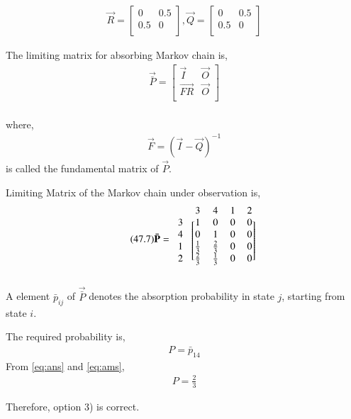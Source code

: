\documentclass[journal,12pt,twocolumn]{IEEEtran}
\begin{document}
\begin{align}
\tag{47.4}
\label{eq:r,q}
    \vec{R}=\begin{bmatrix}
    0 & 0.5\\
    0.5 & 0\\
    \end{bmatrix},
    \vec{Q}=\begin{bmatrix}
    0 & 0.5 \\
    0.5 & 0 \\
    \end{bmatrix}
\end{align}
\begin{definition}
The limiting matrix for absorbing Markov chain is,
\begin{align}
\tag{47.5}
\label{eq:pbar}
    \vec{\bar P}=\begin{bmatrix}
    \vec{I} & \vec{O}\\
    \vec{FR} & \vec{O}\\
    \end{bmatrix}
\end{align}
\\where,
\begin{align}
\tag{47.6}
\label{eq:f}
    \vec{F}=(\vec{I}-\vec{Q})^{-1}
\end{align}
is called the fundamental matrix of $\vec{P}$. \\
\end{definition}
\begin{corollary}
Limiting Matrix of the Markov chain under observation is, 
\begin{align} 
\tag{47.7}
\label{eq:ans}
    \vec{\bar P}=\begin{blockarray}{ccccc}
&3 &4 &1 &2\\
\begin{block}{c[cccc]}
    3 & 1 & 0 & 0 & 0  \\
    4 & 0 & 1 & 0 & 0  \\
    1 & \frac{1}{3} & \frac{2}{3} & 0 & 0 \\
    2 & \frac{2}{3} & \frac{1}{3} & 0 & 0 \\
   \end{block}
\end{blockarray}
\end{align}
\end{corollary}
\begin{definition}
A element $\bar p_{ij}$ of $\vec{\bar P}$ denotes the absorption probability in state $j$, starting from state $i$.
\end{definition}
\begin{corollary}
The required probability is,
\begin{align}
\tag{47.8}
\label{eq:ams}
P =\bar p_{14}
\end{align}
From \eqref{eq:ans} and \eqref{eq:ams},
\begin{align}
\tag{47.9}
P=\frac{2}{3}
\end{align}
\end{corollary}
Therefore, option 3) is correct.\\
\end{document}
